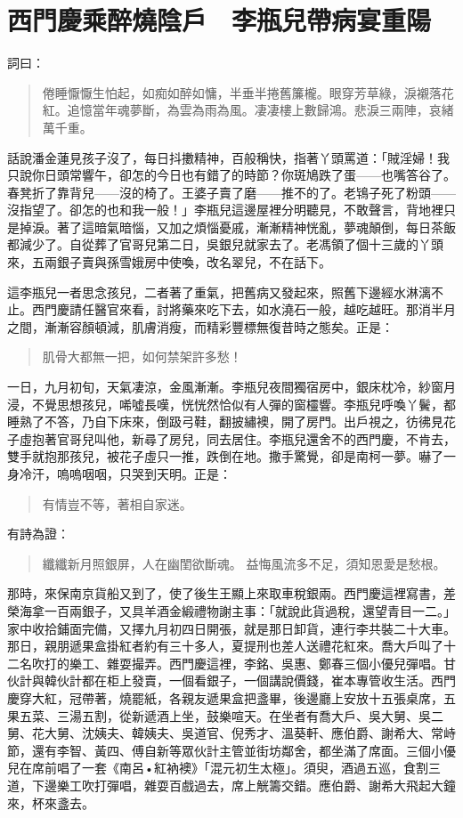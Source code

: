 
\chapter{西門慶乘醉燒陰戶　李瓶兒帶病宴重陽}

詞曰：
\begin{quote}
倦睡懨懨生怕起，如痴如醉如慵，半垂半捲舊簾櫳。眼穿芳草綠，淚襯落花紅。追憶當年魂夢斷，為雲為雨為風。凄凄樓上數歸鴻。悲淚三兩陣，哀緒萬千重。
\end{quote}

話說潘金蓮見孩子沒了，每日抖擻精神，百般稱快，指著丫頭罵道：「賊淫婦！我只說你日頭常響午，卻怎的今日也有錯了的時節？你斑鳩跌了蛋——也嘴答谷了。春凳折了靠背兒——沒的椅了。王婆子賣了磨——推不的了。老鴇子死了粉頭——沒指望了。卻怎的也和我一般！」李瓶兒這邊屋裡分明聽見，不敢聲言，背地裡只是掉淚。著了這暗氣暗惱，又加之煩惱憂戚，漸漸精神恍亂，夢魂顛倒，每日茶飯都減少了。自從葬了官哥兒第二日，吳銀兒就家去了。老馮領了個十三歲的丫頭來，五兩銀子賣與孫雪娥房中使喚，改名翠兒，不在話下。

這李瓶兒一者思念孩兒，二者著了重氣，把舊病又發起來，照舊下邊經水淋漓不止。西門慶請任醫官來看，討將藥來吃下去，如水澆石一般，越吃越旺。那消半月之間，漸漸容顏頓減，肌膚消瘦，而精彩豐標無復昔時之態矣。正是：
\begin{quote}
肌骨大都無一把，如何禁架許多愁！
\end{quote}
一日，九月初旬，天氣凄涼，金風漸漸。李瓶兒夜間獨宿房中，銀床枕冷，紗窗月浸，不覺思想孩兒，唏噓長嘆，恍恍然恰似有人彈的窗欞響。李瓶兒呼喚丫鬢，都睡熟了不答，乃自下床來，倒趿弓鞋，翻披繡襖，開了房門。出戶視之，彷彿見花子虛抱著官哥兒叫他，新尋了房兒，同去居住。李瓶兒還舍不的西門慶，不肯去，雙手就抱那孩兒，被花子虛只一推，跌倒在地。撒手驚覺，卻是南柯一夢。嚇了一身冷汗，嗚嗚咽咽，只哭到天明。正是：
\begin{quote}
有情豈不等，著相自家迷。
\end{quote}
有詩為證：
\begin{quote}
纖纖新月照銀屏，人在幽閨欲斷魂。
益悔風流多不足，須知恩愛是愁根。
\end{quote}

那時，來保南京貨船又到了，使了後生王顯上來取車稅銀兩。西門慶這裡寫書，差榮海拿一百兩銀子，又具羊酒金緞禮物謝主事：「就說此貨過稅，還望青目一二。」家中收拾鋪面完備，又擇九月初四日開張，就是那日卸貨，連行李共裝二十大車。那日，親朋遞果盒掛紅者約有三十多人，夏提刑也差人送禮花紅來。喬大戶叫了十二名吹打的樂工、雜耍撮弄。西門慶這裡，李銘、吳惠、鄭春三個小優兒彈唱。甘伙計與韓伙計都在柜上發賣，一個看銀子，一個講說價錢，崔本專管收生活。西門慶穿大紅，冠帶著，燒罷紙，各親友遞果盒把盞畢，後邊廳上安放十五張桌席，五果五菜、三湯五割，從新遞酒上坐，鼓樂喧天。在坐者有喬大戶、吳大舅、吳二舅、花大舅、沈姨夫、韓姨夫、吳道官、倪秀才、溫葵軒、應伯爵、謝希大、常峙節，還有李智、黃四、傅自新等眾伙計主管並街坊鄰舍，都坐滿了席面。三個小優兒在席前唱了一套《南呂•紅衲襖》「混元初生太極」。須臾，酒過五巡，食割三道，下邊樂工吹打彈唱，雜耍百戲過去，席上觥籌交錯。應伯爵、謝希大飛起大鐘來，杯來盞去。

